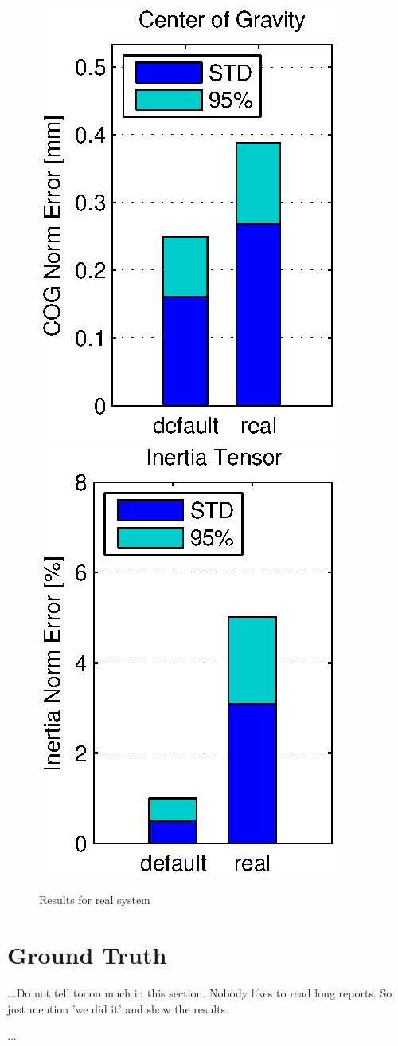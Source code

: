 \begin{figure}[hbtp]
\includegraphics[scale=.72]{images/results/err_cmp_real_cog.eps}
\includegraphics[scale=.72]{images/results/err_cmp_real_tensor.eps}
\caption{Results for real system}
\label{fig:tangential_frame}
\end{figure}


\section{Ground Truth}
...Do not tell toooo much in this section. Nobody likes to read long reports. So just mention 'we did it' and show the results.

...